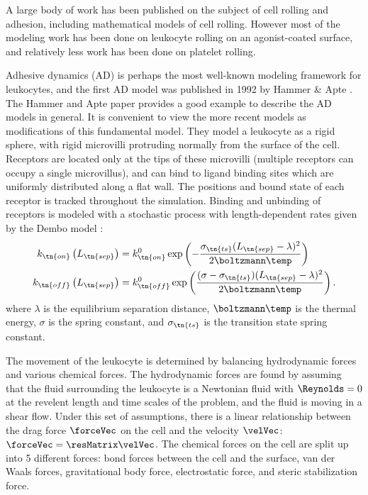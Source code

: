 A large body of work has been published on the subject of cell rolling
and adhesion, including mathematical models of cell rolling. However
most of the modeling work has been done on leukocyte rolling on an
agonist-coated surface, and relatively less work has been done on
platelet rolling.

Adhesive dynamics (AD) is perhaps the most well-known modeling
framework for leukocytes, and the first AD model was published in 1992
by Hammer \& Apte \cite{Hammer1992}. The Hammer and Apte paper
provides a good example to describe the AD models in general. It is
convenient to view the more recent models as modifications of this
fundamental model. They model a leukocyte as a rigid sphere, with
rigid microvilli protruding normally from the surface of the
cell. Receptors are located only at the tips of these microvilli
(multiple receptors can occupy a single microvillus), and can bind to
ligand binding sites which are uniformly distributed along a flat
wall. The positions and bound state of each receptor is tracked
throughout the simulation. Binding and unbinding of receptors is
modeled with a stochastic process with length-dependent rates given by
the Dembo model \cite{Dembo1988}:
\begin{align}
  \label{eq:dembo-on}
  k_\tn{on} \left(L_\tn{sep}\right)
  &= k_\tn{on}^0 \exp \left( -\frac{\sigma_\tn{ts} (L_\tn{sep} -
    \lambda)^2}{2\boltzmann \temp} \right) \\
  \label{eq:dembo-off}
  k_\tn{off} \left(L_\tn{sep}\right)
  &= k_\tn{off}^0 \exp \left( \frac{(\sigma - \sigma_\tn{ts})
    (L_\tn{sep} - \lambda)^2}{2 \boltzmann \temp} \right).
\end{align}
where $\lambda$ is the equilibrium separation distance,
$\boltzmann\temp$ is the thermal energy, $\sigma$ is the spring
constant, and $\sigma_\tn{ts}$ is the transition state spring
constant.

The movement of the leukocyte is determined by balancing hydrodynamic
forces and various chemical forces. The hydrodynamic forces are found
by assuming that the fluid surrounding the leukocyte is a Newtonian
fluid with $\Reynolds = 0$ at the revelent length and time scales of
the problem, and the fluid is moving in a shear flow. Under this set
of assumptions, there is a linear relationship between the drag force
$\forceVec$ on the cell and the velocity $\velVec$: $\forceVec =
\resMatrix \velVec$. The chemical forces on the cell are split up into
5 different forces: bond forces between the cell and the surface, van
der Waals forces, gravitational body force, electrostatic force, and
steric stabilization force.
